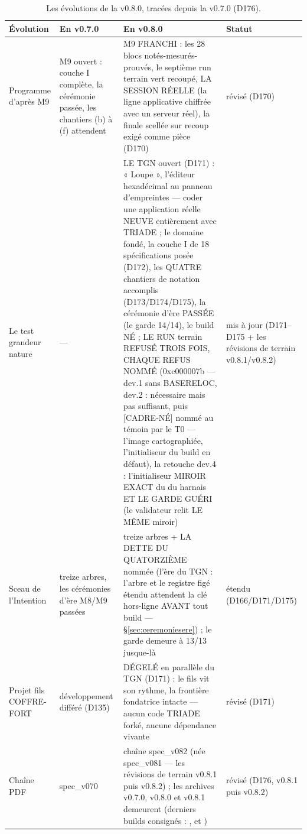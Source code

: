 \begin{table}[htbp]
\centering\small
\caption{Les évolutions de la v0.8.0, tracées depuis la v0.7.0 (D176).}
\label{tab:correspondance080}
\begin{tabularx}{\textwidth}{@{}l Y Y l@{}}
\toprule
\textbf{Évolution} & \textbf{En v0.7.0} & \textbf{En v0.8.0} & \textbf{Statut} \\
\midrule
Programme d'après M9 & M9 ouvert : couche I complète, la cérémonie passée, les
chantiers (b) à (f) attendent & M9 FRANCHI : les 28 blocs notés-mesurés-prouvés,
le septième run terrain vert recoupé, LA SESSION RÉELLE (la ligne applicative
chiffrée avec un serveur réel), la finale  scellée sur recoup exigé
comme pièce (D170) & révisé (D170) \\
Le test grandeur nature & — & LE TGN ouvert (D171) : « Loupe », l'éditeur
hexadécimal au panneau d'empreintes — coder une application réelle NEUVE
entièrement avec TRIADE ; le domaine  fondé, la couche I de 18
spécifications posée (D172), les QUATRE chantiers de notation accomplis
(D173/D174/D175), la cérémonie d'ère PASSÉE (le garde 14/14), le build
 NÉ ; LE RUN terrain REFUSÉ TROIS FOIS, CHAQUE REFUS
NOMMÉ (0xc000007b — dev.1 sans BASERELOC, dev.2 : nécessaire mais pas suffisant,
puis [CADRE-NÉ] nommé au témoin par le T0 — l'image cartographiée, l'initialiseur
du build en défaut), la retouche dev.4 : l'initialiseur  MIROIR EXACT
du  du harnais ET LE GARDE GUÉRI (le validateur relit LE MÊME
miroir) & mis
à jour (D171--D175 + les révisions de terrain v0.8.1/v0.8.2) \\
Sceau de l'Intention & treize arbres, les cérémonies d'ère M8/M9 passées & treize
arbres + LA DETTE DU QUATORZIÈME nommée (l'ère du TGN : l'arbre  et
le registre figé étendu attendent la clé hors-ligne AVANT tout build —
§\ref{sec:ceremoniesere}) ; le garde demeure à 13/13 jusque-là & étendu
(D166/D171/D175) \\
Projet fils COFFRE-FORT & développement différé (D135) & DÉGELÉ en parallèle du
TGN (D171) : le fils vit son rythme, la frontière fondatrice intacte — aucun code
TRIADE forké, aucune dépendance vivante & révisé (D171) \\
Chaîne PDF & spec\_v070 & chaîne spec\_v082 (née spec\_v081 — les révisions de
terrain v0.8.1 puis v0.8.2) ; les archives v0.7.0, v0.8.0 et v0.8.1 demeurent
(derniers builds consignés : ,  et
) & révisé (D176, v0.8.1 puis v0.8.2) \\
\bottomrule
\end{tabularx}
\end{table}

